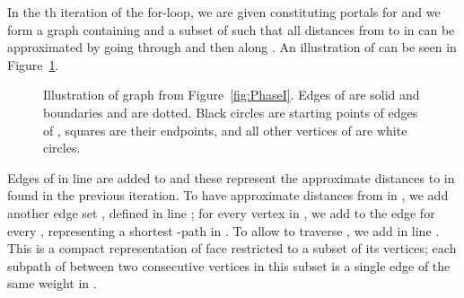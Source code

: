 \documentclass[11pt]{article}
\begin{document}
In the th iteration of the for-loop, we are given  constituting portals for  and we form a graph  containing  and a subset of  such that all distances from  to  in  can be approximated by going through  and then along . An illustration of  can be seen in Figure~\ref{fig:HiPhaseIData}.
\begin{figure}\centerline{}
\caption{Illustration of graph  from Figure~\ref{fig:PhaseI}. Edges of  are solid and boundaries  and  are dotted. Black circles are starting points of edges of , squares are their endpoints, and all other vertices of  are white circles.}
\label{fig:HiPhaseIData}
\end{figure}

Edges of  in line  are added to  and these represent the approximate distances to  in  found in the previous iteration. To have  approximate distances from  in , we add another edge set , defined in line ; for every vertex in , we add to  the edge  for every , representing a shortest -path in . To allow  to traverse , we add  in line . This is a compact representation of face  restricted to a subset of its vertices; each subpath of  between two consecutive vertices in this subset is a single edge of the same weight in .
\end{document}
